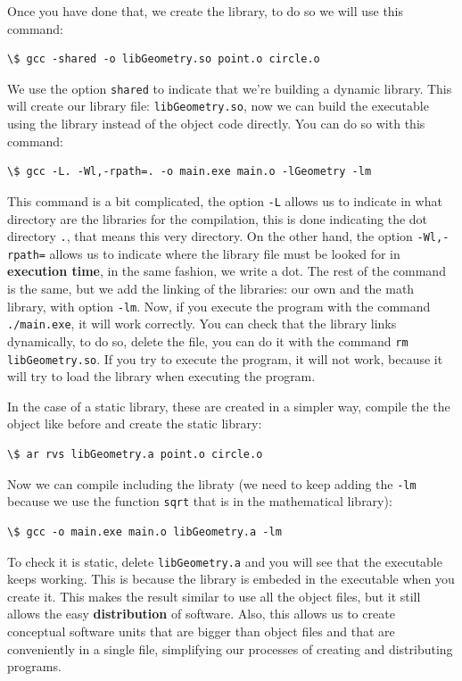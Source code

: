 \documentclass[a4paper]{article}
\begin{document}
Once you have done that, we create the library, to do so we will use this
command:
\begin{lstlisting}[style=terminalStyle]
\$ gcc -shared -o libGeometry.so point.o circle.o
\end{lstlisting}

We use the option \verb!shared! to indicate that we're building a dynamic
library. This will create our library file: \verb!libGeometry.so!, now we
can build the executable using the library instead of the object code directly.
You can do so with this command:
\begin{lstlisting}[style=terminalStyle]
\$ gcc -L. -Wl,-rpath=. -o main.exe main.o -lGeometry -lm
\end{lstlisting}

This command is a bit complicated, the option \verb!-L! allows us to indicate in
what directory are the libraries for the compilation, this is done indicating
the dot directory \verb!.!, that means this very directory. On the other hand,
the option \verb!-Wl,-rpath=! allows us to indicate where the library file must
be looked for in \textbf{execution time}, in the same fashion, we write a dot.
The rest of the command is the same, but we add the linking of the libraries:
our own and the math library, with option \verb!-lm!. Now, if you execute the
program with the command \verb!./main.exe!, it will work correctly. You can
check that the library links dynamically, to do so, delete the file, you can do
it with the command \verb!rm libGeometry.so!. If you try to execute the program,
it will not work, because it will try to load the library when executing the
program.

In the case of a static library, these are created in a simpler way, compile the
the object like before and create the static library:
\begin{lstlisting}[style=terminalStyle]
\$ ar rvs libGeometry.a point.o circle.o
\end{lstlisting}

Now we can compile including the libraty (we need to keep adding the \verb!-lm!
because we use the function \verb!sqrt! that is in the mathematical library):
\begin{lstlisting}[style=terminalStyle]
\$ gcc -o main.exe main.o libGeometry.a -lm
\end{lstlisting}

To check it is static, delete \verb!libGeometry.a! and you will see that the
executable keeps working. This is because the library is embeded in the
executable when you create it. This makes the result similar to use all the
object files, but it still allows the easy \textbf{distribution} of software.
Also, this allows us to create conceptual software units that are bigger than
object files and that are conveniently in a single file, simplifying our
processes of creating and distributing programs.
\end{document}
